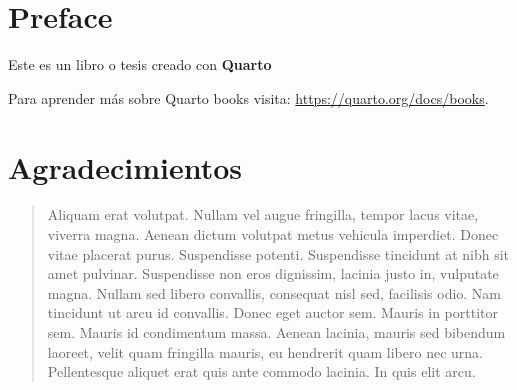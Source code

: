 \documentclass[
  12pt,
  letterpaper,
  DIV=11,
  numbers=noendperiod,
  oneside]{scrreport}
\author{}
\date{}
\renewcommand*\contentsname{Tabla de contenidos}
\newcommand\contentsname{Tabla de contenidos}
\begin{document}
\renewcommand*\contentsname{Tabla de contenidos}
{
\hypersetup{linkcolor=Black}
\setcounter{tocdepth}{2}
\tableofcontents
}
\listoffigures
\listoftables
{}

\chapter*{Preface}\label{preface}


Este es un libro o tesis creado con \textbf{Quarto}

Para aprender más sobre Quarto books visita:
\url{https://quarto.org/docs/books}.


\chapter*{Agradecimientos}\label{agradecimientos}


\begin{quote}
Aliquam erat volutpat. Nullam vel augue fringilla, tempor lacus vitae,
viverra magna. Aenean dictum volutpat metus vehicula imperdiet. Donec
vitae placerat purus. Suspendisse potenti. Suspendisse tincidunt at nibh
sit amet pulvinar. Suspendisse non eros dignissim, lacinia justo in,
vulputate magna. Nullam sed libero convallis, consequat nisl sed,
facilisis odio. Nam tincidunt ut arcu id convallis. Donec eget auctor
sem. Mauris in porttitor sem. Mauris id condimentum massa. Aenean
lacinia, mauris sed bibendum laoreet, velit quam fringilla mauris, eu
hendrerit quam libero nec urna. Pellentesque aliquet erat quis ante
commodo lacinia. In quis elit arcu.
\end{quote}
\end{document}
